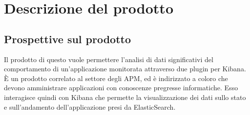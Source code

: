 \section{Descrizione del prodotto} \label{descrizione}
	\subsection{Prospettive sul prodotto}
	Il prodotto di questo  vuole permettere l'analisi di dati significativi del comportamento di un'applicazione monitorata attraverso due plugin per Kibana.
	È un prodotto correlato al settore degli APM, ed è indirizzato a coloro che devono amministrare applicazioni con conoscenze pregresse informatiche. Esso interagisce quindi con Kibana che permette la visualizzazione dei dati sullo stato e sull'andamento dell'applicazione presi da ElasticSearch.
